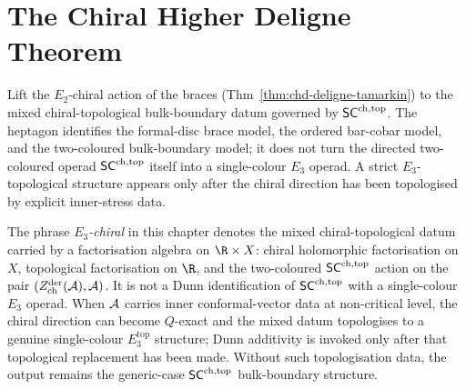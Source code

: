 \section{The Chiral Higher Deligne Theorem}
\label{sec:chd-main}

Lift the $E_2$-chiral action of the braces
(Thm~\ref{thm:chd-deligne-tamarkin}) to the mixed
chiral-topological bulk-boundary datum governed by $\mathsf{SC}^{\mathrm{ch},\mathrm{top}}$. The
heptagon identifies the formal-disc brace model, the ordered
bar-cobar model, and the two-coloured bulk-boundary model; it does not
turn the directed two-coloured operad $\mathsf{SC}^{\mathrm{ch},\mathrm{top}}$ itself into a single-colour
$E_3$ operad. A strict $E_3$-topological structure appears only after
the chiral direction has been topologised by explicit inner-stress
data.

\begin{convention}%
\label{conv:chd-e3-chiral-meaning}%
%
The phrase \emph{$E_3$-chiral} in this chapter denotes the mixed
chiral-topological datum carried by a factorisation algebra on
$\R\times X$: chiral holomorphic factorisation on $X$, topological
factorisation on $\R$, and the two-coloured $\mathsf{SC}^{\mathrm{ch},\mathrm{top}}$ action on the
pair $(Z^{\mathrm{der}}_{\mathrm{ch}}(\mathcal{A}),\mathcal{A})$. It is not a Dunn
identification of $\mathsf{SC}^{\mathrm{ch},\mathrm{top}}$ with a single-colour $E_3$ operad. When
$\mathcal{A}$ carries inner conformal-vector data at non-critical level, the
chiral direction can become $Q$-exact and the mixed datum topologises
to a genuine single-colour $E_3^{\mathrm{top}}$ structure; Dunn
additivity is invoked only after that topological replacement has been
made. Without such topologisation data, the output remains the
generic-case $\mathsf{SC}^{\mathrm{ch},\mathrm{top}}$ bulk-boundary structure.
\end{convention}

